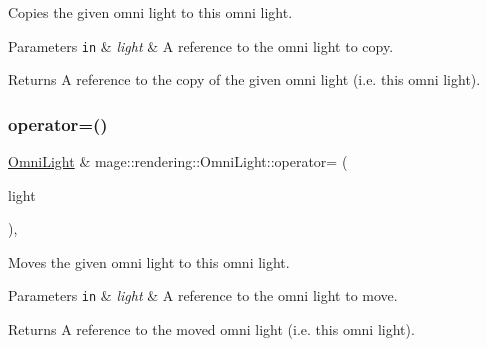 Copies the given omni light to this omni light.


\begin{DoxyParams}[1]{Parameters}
\mbox{\tt in}  & {\em light} & A reference to the omni light to copy. \\
\hline
\end{DoxyParams}
\begin{DoxyReturn}{Returns}
A reference to the copy of the given omni light (i.\+e. this omni light). 
\end{DoxyReturn}
\mbox{\label{classmage_1_1rendering_1_1_omni_light_a8126d5d0d3a45d0063c3fd2f28e3826e}} 
\subsubsection{\texorpdfstring{operator=()}{operator=()}\hspace{0.1cm}{\footnotesize\ttfamily [2/2]}}
{\footnotesize\ttfamily \mbox{\hyperlink{classmage_1_1rendering_1_1_omni_light}{Omni\+Light}} \& mage\+::rendering\+::\+Omni\+Light\+::operator= (\begin{DoxyParamCaption}\item[{\mbox{\hyperlink{classmage_1_1rendering_1_1_omni_light}{Omni\+Light}} \&\&}]{light }\end{DoxyParamCaption})\hspace{0.3cm}{\ttfamily [default]}, {\ttfamily [noexcept]}}

Moves the given omni light to this omni light.


\begin{DoxyParams}[1]{Parameters}
\mbox{\tt in}  & {\em light} & A reference to the omni light to move. \\
\hline
\end{DoxyParams}
\begin{DoxyReturn}{Returns}
A reference to the moved omni light (i.\+e. this omni light). 
\end{DoxyReturn}
\mbox{\label{classmage_1_1rendering_1_1_omni_light_af1334671baf6f5afeb297fb819118639}} 
